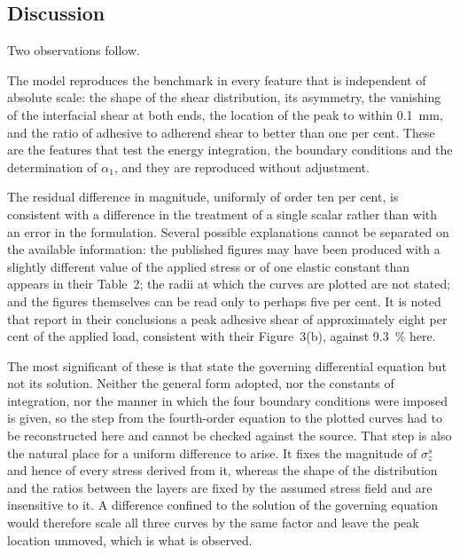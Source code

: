 \subsection{Discussion}
\label{sec:nemesdiscussion}
 
Two observations follow.
 
The model reproduces the benchmark in every feature that is
independent of absolute scale: the shape of the shear distribution, its
asymmetry, the vanishing of the interfacial shear at both ends, the location
of the peak to within \SI{0.1}{\milli\metre}, and the ratio of adhesive to
adherend shear to better than one per cent. These are the features that test
the energy integration, the boundary conditions and the determination of
$\alpha_1$, and they are reproduced without adjustment.
 
The residual difference in magnitude, uniformly of order ten per cent, is
consistent with a difference in the treatment of a single scalar rather than
with an error in the formulation. Several possible explanations cannot be separated on the
available information: the published figures may have been produced with a
slightly different value of the applied stress or of one elastic constant than
appears in their Table~2; the radii at which the curves are plotted are not
stated; and the figures themselves can be read only to perhaps five per cent.
It is noted that \textcite{nemesModelingCylindricalAdhesively2009} report in
their conclusions a peak adhesive shear of approximately eight per cent of the
applied load, consistent with their Figure~3(b), against \SI{9.3}{\percent}
here.
 
The most significant of these is that
\textcite{nemesModelingCylindricalAdhesively2009} state the governing
differential equation but not its solution. Neither the general form adopted,
nor the constants of integration, nor the manner in which the four boundary
conditions were imposed is given, so the step from the fourth-order equation
to the plotted curves had to be reconstructed here and cannot be checked
against the source. That step is also the natural place for a uniform
difference to arise. It fixes the magnitude of $\sigma_z^{s}$ and hence of
every stress derived from it, whereas the shape of the distribution and the
ratios between the layers are fixed by the assumed stress field and are
insensitive to it. A difference confined to the solution of the governing
equation would therefore scale all three curves by the same factor and leave
the peak location unmoved, which is what is observed.
 
